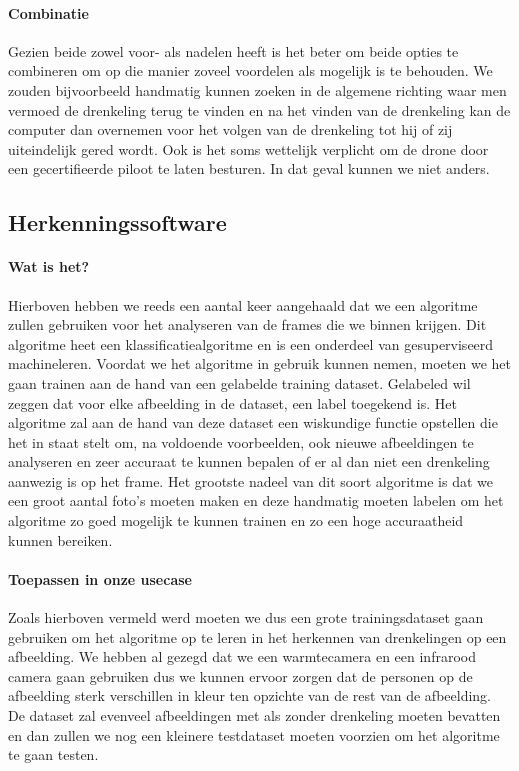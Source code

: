 \paragraph{Combinatie}

Gezien beide zowel voor- als nadelen heeft is het beter om beide opties te combineren om op die manier zoveel voordelen als mogelijk is te behouden. We zouden bijvoorbeeld handmatig kunnen zoeken in de algemene richting waar men vermoed de drenkeling terug te vinden en na het vinden van de drenkeling kan de computer dan overnemen voor het volgen van de drenkeling tot hij of zij uiteindelijk gered wordt. Ook is het soms wettelijk verplicht om de drone door een gecertifieerde piloot te laten besturen. In dat geval kunnen we niet anders.

\subsection{Herkenningssoftware}

\paragraph{Wat is het?}

Hierboven hebben we reeds een aantal keer aangehaald dat we een algoritme zullen gebruiken voor het analyseren van de frames die we binnen krijgen. Dit algoritme heet een klassificatiealgoritme en is een onderdeel van gesuperviseerd machineleren. Voordat we het algoritme in gebruik kunnen nemen, moeten we het gaan trainen aan de hand van een gelabelde training dataset. Gelabeled wil zeggen dat voor elke afbeelding in de dataset, een label toegekend is. Het algoritme zal aan de hand van deze dataset een wiskundige functie opstellen die het in staat stelt om, na voldoende voorbeelden, ook nieuwe afbeeldingen te analyseren en zeer accuraat te kunnen bepalen of er al dan niet een drenkeling aanwezig is op het frame. Het grootste nadeel van dit soort algoritme is dat we een groot aantal foto's moeten maken en deze handmatig moeten labelen om het algoritme zo goed mogelijk te kunnen trainen en zo een hoge accuraatheid kunnen bereiken.

\paragraph{Toepassen in onze usecase}

Zoals hierboven vermeld werd moeten we dus een grote trainingsdataset gaan gebruiken om het algoritme op te leren in het herkennen van drenkelingen op een afbeelding. We hebben al gezegd dat we een warmtecamera en een infrarood camera gaan gebruiken dus we kunnen ervoor zorgen dat de personen op de afbeelding sterk verschillen in kleur ten opzichte van de rest van de afbeelding. De dataset zal evenveel afbeeldingen met als zonder drenkeling moeten bevatten en dan zullen we nog een kleinere testdataset moeten voorzien om het algoritme te gaan testen.

